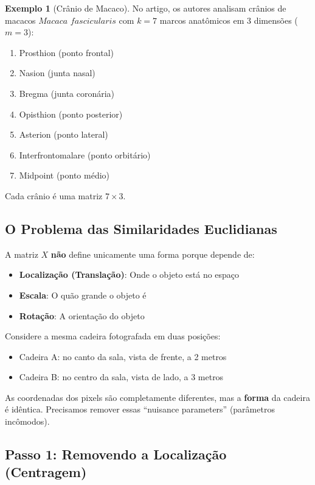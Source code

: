 \documentclass[12pt,a4paper]{article}
\theoremstyle{definition}
\newtheorem{exemplo}{Exemplo}[section]
\begin{document}
\begin{exemplo}[Crânio de Macaco]
No artigo, os autores analisam crânios de macacos $\textit{Macaca fascicularis}$ com $k=7$ marcos anatômicos em 3 dimensões ($m=3$):
\begin{enumerate}
    \item Prosthion (ponto frontal)
    \item Nasion (junta nasal)
    \item Bregma (junta coronária)
    \item Opisthion (ponto posterior)
    \item Asterion (ponto lateral)
    \item Interfrontomalare (ponto orbitário)
    \item Midpoint (ponto médio)
\end{enumerate}
Cada crânio é uma matriz $7 \times 3$.
\end{exemplo}

\subsection{O Problema das Similaridades Euclidianas}

A matriz $X$ \textbf{não} define unicamente uma forma porque depende de:
\begin{itemize}
    \item \textbf{Localização (Translação)}: Onde o objeto está no espaço
    \item \textbf{Escala}: O quão grande o objeto é
    \item \textbf{Rotação}: A orientação do objeto
\end{itemize}

\begin{tcolorbox}[caixaconceito={Exemplo Visual}]
Considere a mesma cadeira fotografada em duas posições:
\begin{itemize}
    \item Cadeira A: no canto da sala, vista de frente, a 2 metros
    \item Cadeira B: no centro da sala, vista de lado, a 3 metros
\end{itemize}
As coordenadas dos pixels são completamente diferentes, mas a \textbf{forma} da cadeira é idêntica. Precisamos remover essas ``nuisance parameters'' (parâmetros incômodos).
\end{tcolorbox}

\subsection{Passo 1: Removendo a Localização (Centragem)}
\end{document}
